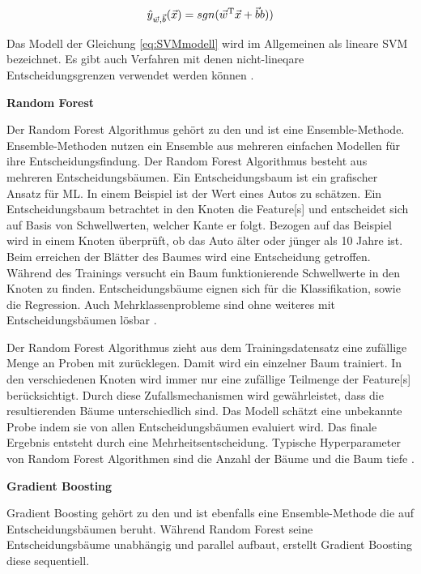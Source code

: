 \begin{equation}
\hat{y}_{\vec{w},\vec{b}}(\vec{x}) = sgn(\vec{w}^\mathrm{T}\vec{x}+\vec{b}b))
\label{eq:SVMmodell}
\end{equation}

Das Modell der Gleichung \ref{eq:SVMmodell} wird im Allgemeinen als lineare \acrshort{SVM} bezeichnet. Es gibt auch Verfahren mit denen nicht-lineqare Entscheidungsgrenzen verwendet werden können \cite{Burkov.2019, Goodfellow.2016, ShalevShwartz.2014}. \dubpar

\textbf{Random Forest}\par
Der Random Forest Algorithmus gehört zu den  und ist eine Ensemble-Methode. Ensemble-Methoden nutzen ein Ensemble aus mehreren einfachen Modellen für ihre Entscheidungsfindung. Der Random Forest Algorithmus besteht aus mehreren Entscheidungsbäumen. Ein Entscheidungsbaum ist ein grafischer Ansatz für \gls{ML}. In einem Beispiel ist der Wert eines Autos zu schätzen. Ein Entscheidungsbaum betrachtet in den Knoten die \gls{Feature}[s] und entscheidet sich auf Basis von Schwellwerten, welcher Kante er folgt. Bezogen auf das Beispiel wird in einem Knoten überprüft, ob das Auto älter oder jünger als 10 Jahre ist. Beim erreichen der Blätter des Baumes wird eine Entscheidung getroffen. Während des Trainings versucht ein Baum funktionierende Schwellwerte in den Knoten zu finden. Entscheidungsbäume eignen sich für die \gls{Klassifikation}, sowie die Regression. Auch Mehrklassenprobleme sind ohne weiteres mit Entscheidungsbäumen lösbar \cite{Burkov.2019, Bishop.2006, Goodfellow.2016}. \par

Der Random Forest Algorithmus zieht aus dem \gls{Trainingsdatensatz} eine zufällige Menge an Proben mit zurücklegen. Damit wird ein einzelner Baum trainiert. In den verschiedenen Knoten wird immer nur eine zufällige Teilmenge der \gls{Feature}[s] berücksichtigt. Durch diese Zufallsmechanismen wird gewährleistet, dass die resultierenden Bäume unterschiedlich sind. Das Modell schätzt eine unbekannte Probe indem sie von allen Entscheidungsbäumen evaluiert wird. Das finale Ergebnis entsteht durch eine Mehrheitsentscheidung. Typische \gls{Hyperparameter} von  Random Forest Algorithmen sind die Anzahl der Bäume und die Baum tiefe \cite{Burkov.2019, Breiman.2001}. \dubpar

\textbf{Gradient Boosting} \par
Gradient Boosting gehört zu den  und ist ebenfalls eine Ensemble-Methode die auf Entscheidungsbäumen beruht. Während Random Forest seine Entscheidungsbäume unabhängig und parallel aufbaut, erstellt Gradient Boosting diese sequentiell. \par 

